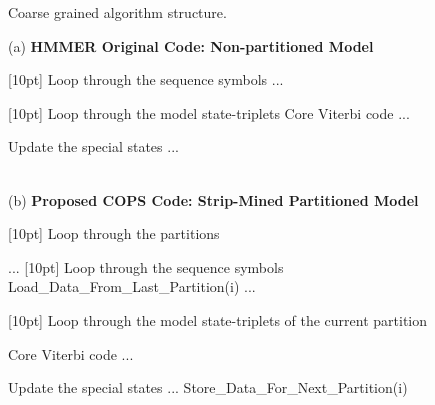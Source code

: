 \documentclass{bmcart}
\begin{document}
\begin{algorithm}[t!]
\centering
  \caption{Coarse grained algorithm structure.}
  \label{table-partitioning-comp}
  \begin{minipage}{1.0\textwidth}
  \smallskip
  \begin{center}
  {\textrm{(a) \bf HMMER Original Code: Non-partitioned Model}}
  \end{center}
\begin{algorithmic}[1]
\LeftComment \raisebox{-1pt}[10pt]{} Loop through the sequence symbols
	\State ...		

	\LeftComment \raisebox{-1pt}[10pt]{} Loop through the model state-triplets
		\LeftComment Core Viterbi code
		\State ...
	\EndFor
	
	\LeftComment Update the special states
	\State ...	
\EndFor
\end{algorithmic}
\end{minipage}

  \begin{minipage}{1.0\textwidth}
  \smallskip
\begin{center}
  \hrulefill \\
  \smallskip
  {\textrm{(b) \bf Proposed COPS Code: Strip-Mined Partitioned Model}}
  \end{center}
\begin{algorithmic}[1]
\LeftComment  \raisebox{-1pt}[10pt]{} Loop through the partitions
	
	\State ...		
	\LeftComment \raisebox{-1pt}[10pt]{} Loop through the sequence symbols
		\State Load\_Data\_From\_Last\_Partition(i)
		\State ...		

		\LeftComment \raisebox{-1pt}[10pt]{} Loop through the model state-triplets of the current partition

			\LeftComment Core Viterbi code
			\State ...
		\EndFor
	
		\LeftComment Update the special states
		\State ...	
		\State Store\_Data\_For\_Next\_Partition(i)
	\EndFor
\EndFor
\end{algorithmic}
  \smallskip
\end{minipage}
\end{algorithm}
\end{document}
